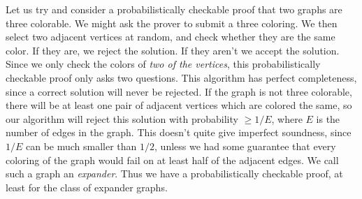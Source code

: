 \documentclass[answers]{exam}
\begin{document}
Let us try and consider a probabilistically checkable proof that two graphs are three colorable. We might ask the prover to submit a three coloring. We then select two adjacent vertices at random, and check whether they are the same color. If they are, we reject the solution. If they aren't we accept the solution. Since we only check the colors of \emph{two of the vertices}, this probabilistically checkable proof only asks two questions. This algorithm has perfect completeness, since a correct solution will never be rejected. If the graph is not three colorable, there will be at least one pair of adjacent vertices which are colored the same, so our algorithm will reject this solution with probability $\geq 1/E$, where $E$ is the number of edges in the graph. This doesn't quite give imperfect soundness, since $1/E$ can be much smaller than $1/2$, unless we had some guarantee that every coloring of the graph would fail on at least half of the adjacent edges. We call such a graph an \emph{expander}. Thus we have a probabilistically checkable proof, at least for the class of expander graphs.

\newpage
\end{document}

